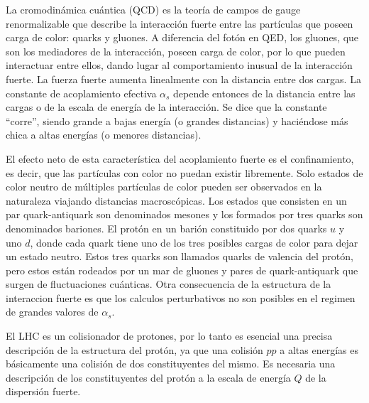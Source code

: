 
La cromodinámica cuántica (QCD) \cite{Ellis:1991qj} es la teoría de campos de gauge
renormalizable que describe la interacción fuerte entre las partículas que
poseen carga de color: quarks y gluones. A diferencia del fotón en QED, los gluones,
que son los mediadores de la interacción, poseen carga de color, por lo que
pueden interactuar entre ellos, dando lugar al comportamiento inusual de la
interacción fuerte. La fuerza fuerte aumenta linealmente con la distancia entre
dos cargas. La constante de acoplamiento efectiva $\alpha_s$ depende entonces de
la distancia entre las cargas o de la escala de energía de la interacción. Se
dice que la constante ``corre'', siendo grande a bajas energía (o grandes
distancias) y haciéndose más chica a altas energías (o menores distancias).

El efecto neto de esta característica del acoplamiento fuerte es el
confinamiento, es decir, que las partículas con color no puedan existir
libremente. Solo estados de color neutro de múltiples partículas de color pueden
ser observados en la naturaleza viajando distancias macroscópicas. Los estados
que consisten en un par quark-antiquark son denominados mesones y  los
 formados por tres quarks son denominados bariones. El protón en un
barión constituido por dos quarks $u$ y uno $d$, donde cada quark tiene uno de
los tres posibles cargas de color para dejar un estado neutro. Estos tres quarks
son llamados quarks de valencia del protón, pero estos están rodeados por un mar
de gluones y pares de quark-antiquark que surgen de fluctuaciones cuánticas.
Otra consecuencia de la estructura de la interaccion fuerte es que los calculos
perturbativos no son posibles en el regimen de grandes valores de $\alpha_s$.

El LHC es un colisionador de protones, por lo tanto es esencial una precisa
descripción de la estructura del protón, ya que una colisión $pp$ a altas
energías es básicamente una colisión de dos constituyentes del mismo. Es
necesaria una descripción de los constituyentes del protón a la escala de
energía $Q$ de la dispersión fuerte.

